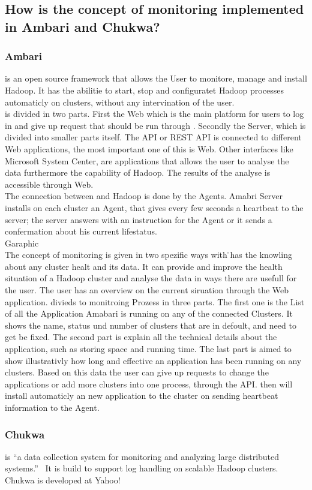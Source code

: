 \subsection{How is the concept of monitoring implemented in Ambari and Chukwa?}
\label{subsec:Implementation}

\subsubsection{Ambari}
\amb is an open source framework that allows the User to monitore, manage and install Hadoop. It has the abilitie to start, stop and configuratet Hadoop processes automaticly on clusters, without any intervination of the user.
\\
\amb is divided in two parts. First the \amb Web which is the main platform for users to log in and give up request that should be run through \amb. Secondly the \amb Server, which is divided into smaller parts itself. The API or REST API is connected to different Web applications, the most important one of this is \amb Web. Other interfaces like Microsoft System Center, are applications that allows the user to analyse the data furthermore the capability of Hadoop. The results of the analyse is accessible through \amb Web.
\\
The connection between \amb and Hadoop is done by the \amb Agents. Amabri Server installs on each cluster an \amb Agent, that gives every few seconds a heartbeat to the server; the server answers with an instruction for the Agent or it sends a confermation about his current lifestatus. 
\\
Garaphic 
\\ 
The concept of monitoring is given in two spezific ways with \amb\. \amb has the knowling about any cluster healt and its data. It can provide and improve the health situation of a Hadoop cluster and analyse the data in ways there are usefull for the user. The user has an overview on the current siruation through the Web application. \amb divieds to monitroing Prozess in three parts. The first one is the List of all the Application Amabari is running on any of the connected Clusters. It shows the name, status und number of clusters that are in defoult, and need to get be fixed. The second part is explain all the technical details about the application, such as storing space and running time. The last part is aimed to show illustrativly how long and effective an application has been running on any clusters. Based on this data the user can give up requests to change the applications or add more clusters into one process, through the API. \amb then will install automaticly an new application to the cluster on sending heartbeat information to the \amb Agent. 

\subsubsection{Chukwa}
\chuklong is ``a data collection system for monitoring and analyzing large distributed systems.''~\cite{Boulona}
It is build to support log handling on scalable Hadoop clusters. Chukwa is developed at Yahoo!~\cite{Rabkin2008a}